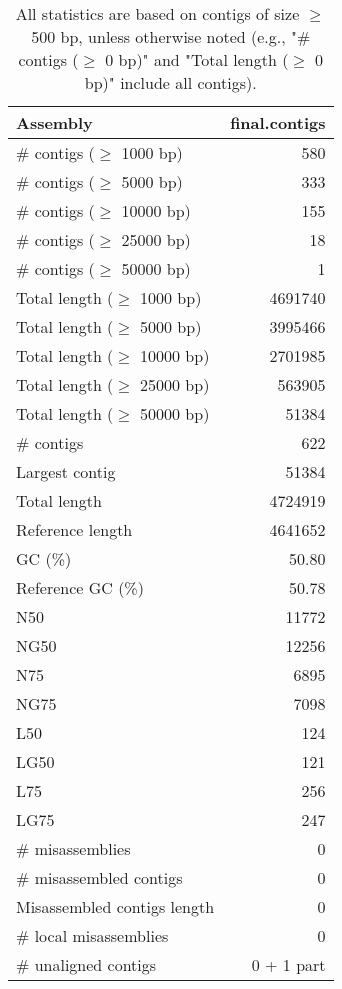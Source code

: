 \documentclass[12pt,a4paper]{article}
\begin{document}
\begin{table}[ht]
\begin{center}
\caption{All statistics are based on contigs of size $\geq$ 500 bp, unless otherwise noted (e.g., "\# contigs ($\geq$ 0 bp)" and "Total length ($\geq$ 0 bp)" include all contigs).}
\begin{tabular}{|l*{1}{|r}|}
\hline
Assembly & final.contigs \\ \hline
\# contigs ($\geq$ 1000 bp) & 580 \\ \hline
\# contigs ($\geq$ 5000 bp) & 333 \\ \hline
\# contigs ($\geq$ 10000 bp) & 155 \\ \hline
\# contigs ($\geq$ 25000 bp) & 18 \\ \hline
\# contigs ($\geq$ 50000 bp) & 1 \\ \hline
Total length ($\geq$ 1000 bp) & 4691740 \\ \hline
Total length ($\geq$ 5000 bp) & 3995466 \\ \hline
Total length ($\geq$ 10000 bp) & 2701985 \\ \hline
Total length ($\geq$ 25000 bp) & 563905 \\ \hline
Total length ($\geq$ 50000 bp) & 51384 \\ \hline
\# contigs & 622 \\ \hline
Largest contig & 51384 \\ \hline
Total length & 4724919 \\ \hline
Reference length & 4641652 \\ \hline
GC (\%) & 50.80 \\ \hline
Reference GC (\%) & 50.78 \\ \hline
N50 & 11772 \\ \hline
NG50 & 12256 \\ \hline
N75 & 6895 \\ \hline
NG75 & 7098 \\ \hline
L50 & 124 \\ \hline
LG50 & 121 \\ \hline
L75 & 256 \\ \hline
LG75 & 247 \\ \hline
\# misassemblies & 0 \\ \hline
\# misassembled contigs & 0 \\ \hline
Misassembled contigs length & 0 \\ \hline
\# local misassemblies & 0 \\ \hline
\# unaligned contigs & 0 + 1 part \\ \hline

\end{tabular}
\end{center}
\end{table}
\end{document}
